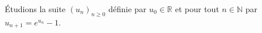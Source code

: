 \documentclass[french,11pt,twoside]{VcCours}
\begin{document}
\begin{Exemple}
Étudions la suite $(u_n)_{n \geq 0}$ définie par $u_0 \in \mathbb{R}$ et pour tout $n \in \mathbb{N}$ par $u_{n+1}=e^{u_n}-1$.

%
%
%
%
%
%
%
%
%
%
%
%
%
%
%
%
\end{Exemple}
\end{document}

